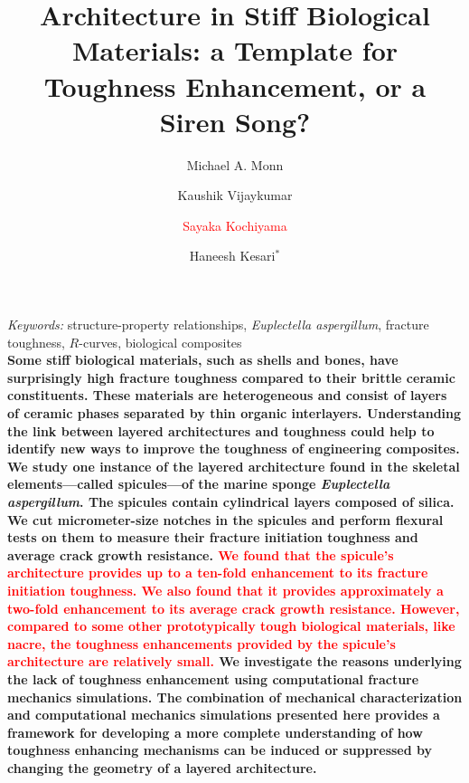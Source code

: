 \documentclass[12pt,onecolumn]{article}
\title{Architecture in Stiff Biological Materials: a Template for Toughness Enhancement, or a Siren Song?}
\author[1]{Michael A. Monn}
\author[1]{Kaushik Vijaykumar}
\author[1]{\textcolor{red}{Sayaka Kochiyama}}
\author[1]{Haneesh Kesari$^*$}
\affil[1]{School of Engineering, Brown University, Providence, RI, USA}
\date{}
\begin{document}
\maketitle
\emph{Keywords:}
structure-property relationships, 
\textit{Euplectella aspergillum}, 
fracture toughness, 
$R$-curves, 
biological composites
\\
{
\singlespacing\small \bf
Some stiff biological materials, such as shells and bones, have surprisingly high fracture toughness compared to their brittle ceramic constituents. These materials are heterogeneous and consist of layers of ceramic phases separated by thin organic interlayers. Understanding the link between layered architectures and toughness could help to identify new ways to improve the toughness of engineering composites. We study one instance of the layered architecture found in the skeletal elements---called spicules---of the marine sponge \textit{Euplectella aspergillum}. The spicules contain cylindrical layers composed of silica. We cut micrometer-size notches in the spicules and perform flexural tests on them to measure their fracture initiation toughness and average crack growth resistance. \textcolor{red}{We found that the spicule's architecture provides up to a ten-fold enhancement to its fracture initiation toughness. We also found that it provides approximately a two-fold enhancement to its average crack growth resistance. However, compared to some other prototypically tough biological materials, like nacre, the toughness enhancements provided by the spicule's architecture are relatively small.} We investigate the reasons underlying the lack of toughness enhancement using computational fracture mechanics simulations. The combination of mechanical characterization and computational mechanics simulations presented here provides a framework for developing a more complete understanding of how toughness enhancing mechanisms can be induced or suppressed by changing the geometry of a layered architecture.
}
\end{document}
